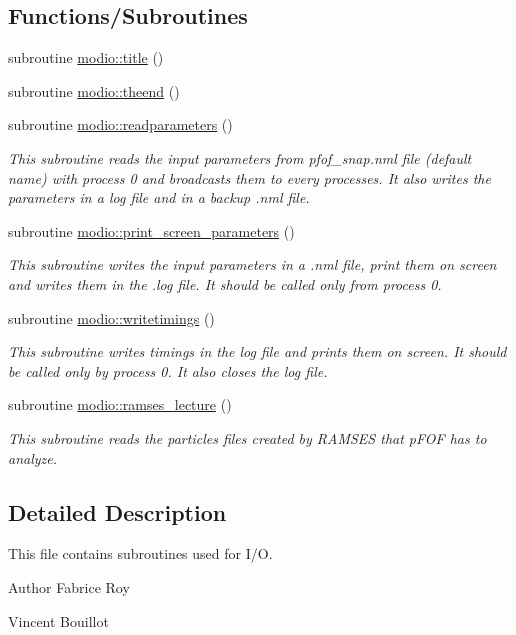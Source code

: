 \subsection*{Functions/\+Subroutines}
\begin{DoxyCompactItemize}
\item 
subroutine \hyperlink{namespacemodio_aefab9476e94da81a75351dbeee74e623}{modio\+::title} ()
\item 
subroutine \hyperlink{namespacemodio_a2688770b2d08498c14ef3212e61d74bf}{modio\+::theend} ()
\item 
subroutine \hyperlink{namespacemodio_aa5e6b5f45cf8cfc091e8e7ff25a97c68}{modio\+::readparameters} ()
\begin{DoxyCompactList}\small\item\em This subroutine reads the input parameters from pfof\+\_\+snap.\+nml file (default name) with process 0 and broadcasts them to every processes. It also writes the parameters in a log file and in a backup .nml file. \end{DoxyCompactList}\item 
subroutine \hyperlink{namespacemodio_a19a738d75d352c974bb25823da81e3d7}{modio\+::print\+\_\+screen\+\_\+parameters} ()
\begin{DoxyCompactList}\small\item\em This subroutine writes the input parameters in a .nml file, print them on screen and writes them in the .log file. It should be called only from process 0. \end{DoxyCompactList}\item 
subroutine \hyperlink{namespacemodio_a6ba64be35b401e31cd35f96ea50bb0c4}{modio\+::writetimings} ()
\begin{DoxyCompactList}\small\item\em This subroutine writes timings in the log file and prints them on screen. It should be called only by process 0. It also closes the log file. \end{DoxyCompactList}\item 
subroutine \hyperlink{namespacemodio_a7bb73858f091ddd46631bcb29022f803}{modio\+::ramses\+\_\+lecture} ()
\begin{DoxyCompactList}\small\item\em This subroutine reads the particles files created by R\+A\+M\+S\+ES that p\+F\+OF has to analyze. \end{DoxyCompactList}\end{DoxyCompactItemize}


\subsection{Detailed Description}
This file contains subroutines used for I/O. 

\begin{DoxyAuthor}{Author}
Fabrice Roy 

Vincent Bouillot 
\end{DoxyAuthor}

